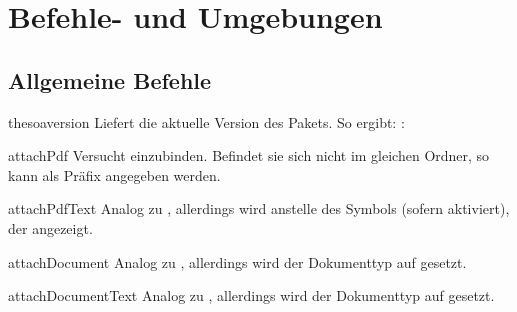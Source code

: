 \documentclass{sopra-base}
\begin{document}
%
%
%
%

\section{Befehle- und Umgebungen}

\subsection{Allgemeine Befehle}

\begin{command}{thesoaversion}{}
    Liefert die aktuelle Version des Pakets. So ergibt: : \thesoaversion\\
\end{command}

\begin{command}{attachPdf}{}
    Versucht  einzubinden. Befindet sie sich nicht im gleichen Ordner, so kann
     als Präfix angegeben werden. 
\end{command}

\begin{command}{attachPdfText}{}
    Analog zu , allerdings wird anstelle des Symbols (sofern aktiviert),
    der  angezeigt.
\end{command}

\begin{command}{attachDocument}{}
    Analog zu , allerdings wird der Dokumenttyp auf  gesetzt. 
\end{command}

\begin{command}{attachDocumentText}{}
    Analog zu , allerdings wird der Dokumenttyp auf  gesetzt. 
\end{command}
\end{document}
